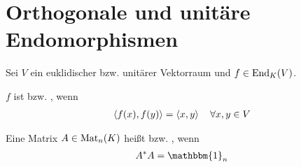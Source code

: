 \section{Orthogonale und unitäre Endomorphismen}

Sei $V$ ein euklidischer bzw. unitärer Vektorraum und $f\in\operatorname{End}_K(V)$.

\begin{definition}
	$f$ ist  bzw. , wenn 
	\begin{align}
		\left\langle f(x),f(y)\right\rangle=\left\langle x,y\right\rangle\quad\forall x,y\in V\notag
	\end{align}
\end{definition}

\begin{definition}
	Eine Matrix $A\in\operatorname{Mat}_n(K)$ heißt  bzw. , wenn
	\begin{align}
		A^*A=\mathbbm{1}_n\notag
	\end{align}
\end{definition}